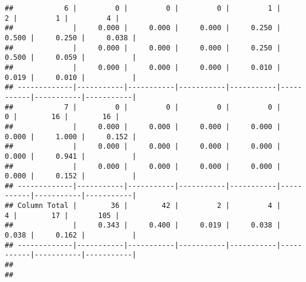 \documentclass[]{article}
\begin{document}
\begin{verbatim}
##            6 |         0 |         0 |         0 |         1 |         2 |         1 |         4 | 
##              |     0.000 |     0.000 |     0.000 |     0.250 |     0.500 |     0.250 |     0.038 | 
##              |     0.000 |     0.000 |     0.000 |     0.250 |     0.500 |     0.059 |           | 
##              |     0.000 |     0.000 |     0.000 |     0.010 |     0.019 |     0.010 |           | 
## -------------|-----------|-----------|-----------|-----------|-----------|-----------|-----------|
##            7 |         0 |         0 |         0 |         0 |         0 |        16 |        16 | 
##              |     0.000 |     0.000 |     0.000 |     0.000 |     0.000 |     1.000 |     0.152 | 
##              |     0.000 |     0.000 |     0.000 |     0.000 |     0.000 |     0.941 |           | 
##              |     0.000 |     0.000 |     0.000 |     0.000 |     0.000 |     0.152 |           | 
## -------------|-----------|-----------|-----------|-----------|-----------|-----------|-----------|
## Column Total |        36 |        42 |         2 |         4 |         4 |        17 |       105 | 
##              |     0.343 |     0.400 |     0.019 |     0.038 |     0.038 |     0.162 |           | 
## -------------|-----------|-----------|-----------|-----------|-----------|-----------|-----------|
## 
## 
\end{verbatim}
\end{document}
